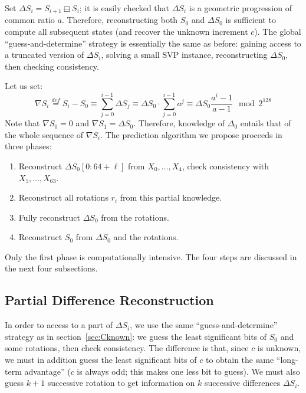 \documentclass[submission,svgnames,journal=tosc]{iacrtrans}
\begin{document}
Set $\Delta S_i = S_{i+1} \boxminus S_i$; it is easily checked that $\Delta S_i$ is a
geometric progression of common ratio $a$. Therefore, reconstructing both $S_0$
and $\Delta S_0$ is sufficient to compute all subsequent states (and recover the
unknown increment $c$). The global ``guess-and-determine'' strategy is
essentially the same as before: gaining access to a truncated version of
$\Delta S_i$, solving a small SVP instance, reconstructing $\Delta S_0$, then
checking consistency.

Let us set:
\begin{equation}\label{eq:nabla}
  \nabla S_i \stackrel{def}{=} S_i - S_0 \equiv \sum_{j=0}^{i-1} \Delta S_j \equiv \Delta S_0 \cdot \sum_{j=0}^{i-1} a^j \equiv \Delta S_0 \frac{a^i-1}{a-1} \mod 2^{128}
\end{equation}
Note that $\nabla S_0 = 0$ and $\nabla S_1 = \Delta S_0$. Therefore, knowledge
of $\Delta_0$ entails that of the whole sequence of $\nabla S_i$. The prediction
algorithm we propose proceeds in three phases:
\begin{enumerate}
\item Reconstruct $\Delta S_0[0:64+\ell]$ from $X_0, \dots, X_{4}$, check consistency with $X_5, \dots, X_{63}$.
\item Reconstruct all rotations $r_i$ from this partial knowledge.
\item Fully reconstruct $\Delta S_0$ from the rotations.
\item Reconstruct $S_0$ from $\Delta S_0$ and the rotations.
\end{enumerate}

\noindent Only the first phase is computationally intensive. The four steps are discussed in the next four subsections.

\subsection{Partial Difference Reconstruction}
\label{sec:cvp_small_2}

In order to access to a part of $\Delta S_i$, we use the same
``guess-and-determine'' strategy as in section~\ref{sec:Cknown}: we guess the
least significant bits of $S_0$ and some rotations, then check consistency. The
difference is that, since $c$ is unknown, we must in addition guess the least
significant bits of $c$ to obtain the same ``long-term advantage'' ($c$ is
always odd; this makes one less bit to guess). We must also guess $k+1$
successive rotation to get information on $k$ successive differences
$\Delta S_i$.
\end{document}
